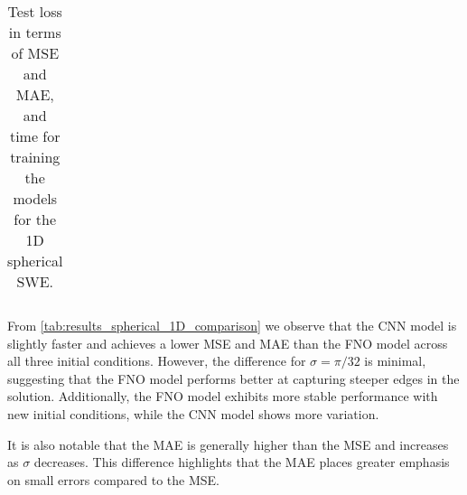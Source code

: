 \begin{table}[H]
\begin{tabular}{c|ccc|ccc|ccc}
         &
         &
         &
         &
         &
         &
         
        \\ 
        \hline
    \end{tabular}
    \caption{Test loss in terms of MSE and MAE, and time for training the models for the 1D spherical SWE.}\label{tab:results_spherical_1D_comparison}
\end{table}
From \autoref{tab:results_spherical_1D_comparison} we observe that the CNN model is slightly faster and achieves a lower MSE and MAE than the FNO model across all three initial conditions.
However, the difference for $\sigma = \pi/32$ is minimal, suggesting that the FNO model performs better at capturing steeper edges in the solution.
Additionally, the FNO model exhibits more stable performance with new initial conditions, while the CNN model shows more variation.

It is also notable that the MAE is generally higher than the MSE and increases as $\sigma$ decreases.
This difference highlights that the MAE places greater emphasis on small errors compared to the MSE.

